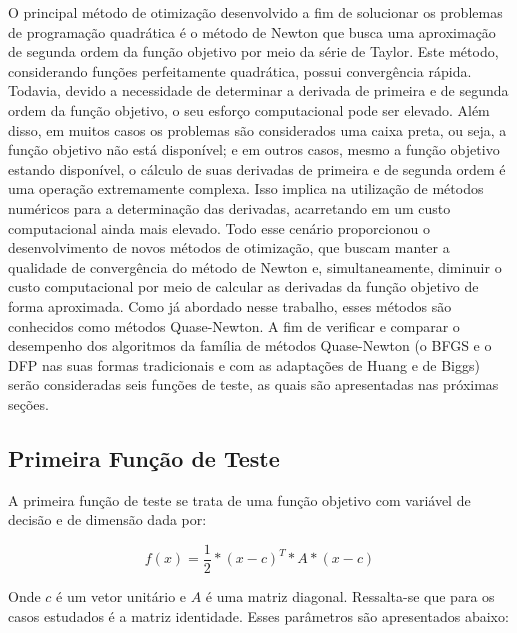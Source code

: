 O principal método de otimização desenvolvido a fim de solucionar os problemas de programação quadrática é o método de Newton que busca uma aproximação de segunda ordem da função objetivo por meio da série de Taylor. Este método, considerando funções perfeitamente quadrática, possui convergência rápida. Todavia, devido a necessidade de determinar a derivada de primeira e de segunda ordem da função objetivo, o seu esforço computacional pode ser elevado. Além disso, em muitos casos os problemas são considerados uma caixa preta, ou seja, a função objetivo não está disponível; e em outros casos, mesmo a função objetivo estando disponível, o cálculo de suas derivadas de primeira e de segunda ordem é uma operação extremamente complexa. Isso implica na utilização de métodos numéricos para a determinação das derivadas, acarretando em um custo computacional ainda mais elevado.
Todo esse cenário proporcionou o desenvolvimento de novos métodos de otimização, que buscam manter a qualidade de convergência do método de Newton e, simultaneamente, diminuir o custo computacional por meio de calcular as derivadas da função objetivo de forma aproximada. Como já abordado nesse trabalho, esses métodos são conhecidos como métodos Quase-Newton.
A fim de verificar e comparar o desempenho dos algoritmos da família de métodos Quase-Newton (o BFGS e o DFP nas suas formas tradicionais e com as adaptações de Huang e de Biggs) serão consideradas seis funções de teste, as quais são apresentadas nas próximas seções.

\subsection{Primeira Função de Teste}\label{sec:prifun}

A primeira função de teste se trata de uma função objetivo com variável de decisão e de dimensão dada por:

\begin{equation}\label{eq:prifuntst}
  f(x)= \frac{1}{2}*(x-c)^{T}*A*(x-c)
\end{equation}

Onde $c$ é um vetor unitário e $A$ é uma matriz diagonal. Ressalta-se que para os casos estudados é a matriz identidade. Esses parâmetros são apresentados abaixo:

